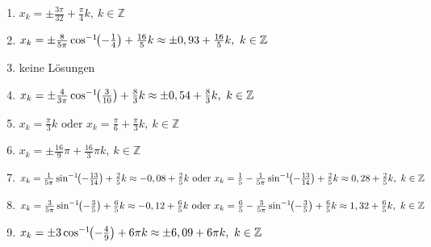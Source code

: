 \documentclass[a4paper,12pt, headsepline, ngerman]{scrartcl}
\theoremstyle{definition}
\newcommand{\arcsinn}[1]{\sin^{-1}\hspace{-3pt}\left(#1\right)}
\newcommand{\arccoss}[1]{\cos^{-1}\hspace{-3pt}\left(#1\right)}
\newcommand{\Z}{\mathbb{Z}}
\newcommand{\fakesubsection}[1]{%
	\par\refstepcounter{subsection}%
	\subsectionmark{#1}%
	\addcontentsline{toc}{subsection}{\protect\numberline{\thesubsection}#1}%
}
\begin{document}
\begin{Answer}[ref=sincosGleichungenAllgA1]
\begin{enumerate}[label=\alph*)]
	\item \(x_k=\pm \frac{3\pi}{32} +\frac{\pi}{4} k,\ k\in\Z\)
	\item \(x_k=\pm \frac{8}{5\pi}\arccoss{-\frac{1}{4}} +\frac{16}{5} k\approx\pm 0,93 +\frac{16}{5} k,\ k\in\Z\)
	\item keine Lösungen
	\item \(x_k=\pm \frac{4}{3\pi}\arccoss{\frac{3}{10}} +\frac{8}{3} k\approx\pm 0,54 +\frac{8}{3} k,\ k\in\Z\)
	\item \(x_k=\frac{\pi}{3} k\text{ oder }x_k=\frac{\pi}{6} +\frac{\pi}{3} k,\ k\in\Z\)
	\item \(x_k=\pm \frac{16}{9}\pi +\frac{16}{3}\pi k,\ k\in\Z\)
	\item \(x_k=\frac{1}{5\pi}\arcsinn{-\frac{13}{14}} +\frac{2}{5} k\approx -0,08+\frac{2}{5} k\text{ oder }x_k=\frac{1}{5}-\frac{1}{5\pi}\arcsinn{-\frac{13}{14}} +\frac{2}{5} k\approx 0,28+\frac{2}{5} k,\ k\in\Z\)
	\item \(x_k=\frac{3}{5\pi}\arcsinn{-\frac{3}{5}} +\frac{6}{5} k\approx -0,12+\frac{6}{5} k\text{ oder }x_k=\frac{6}{5}-\frac{3}{5\pi}\arcsinn{-\frac{3}{5}} +\frac{6}{5} k\approx 1,32+\frac{6}{5} k,\ k\in\Z\)
	\item \(x_k=\pm 3\arccoss{-\frac{4}{9}} +6\pi k\approx \pm 6,09 +6\pi k,\ k\in\Z\)
\end{enumerate}
\end{Answer}

\end{document}
